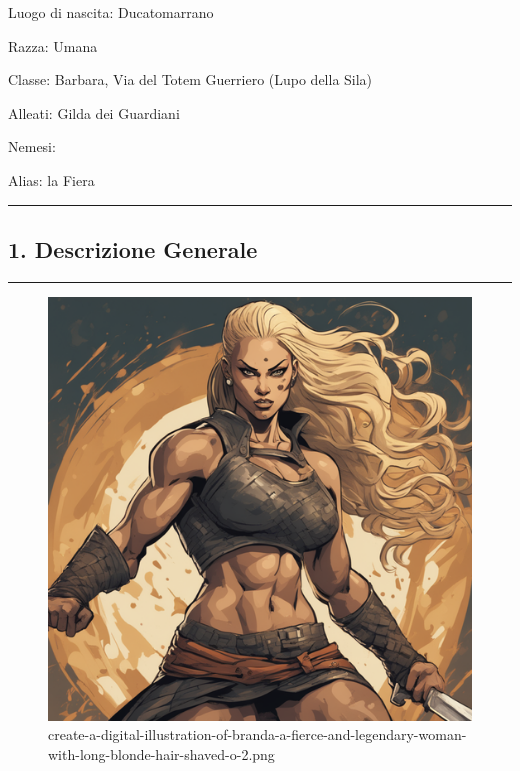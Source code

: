 Luogo di nascita: Ducatomarrano

Razza: Umana

Classe: Barbara, Via del Totem Guerriero (Lupo della Sila)

Alleati: Gilda dei Guardiani

Nemesi:

Alias: la Fiera

\begin{center}\rule{0.5\linewidth}{0.5pt}\end{center}

\subsection{1. Descrizione Generale}\label{descrizione-generale}

\begin{center}\rule{0.5\linewidth}{0.5pt}\end{center}

\begin{figure}
\centering
\includegraphics{create-a-digital-illustration-of-branda-a-fierce-and-legendary-woman-with-long-blonde-hair-shaved-o-2.png}
\caption{create-a-digital-illustration-of-branda-a-fierce-and-legendary-woman-with-long-blonde-hair-shaved-o-2.png}
\end{figure}

